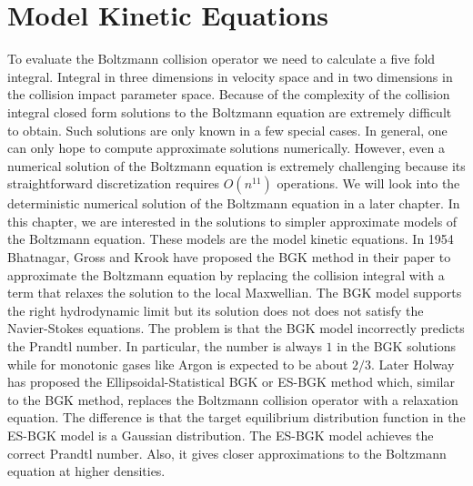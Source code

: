 \section{Model Kinetic Equations}
To evaluate the Boltzmann collision operator we need to calculate a five fold integral. Integral in three dimensions in velocity space and in two dimensions in the collision impact parameter space. Because of the complexity of the collision integral closed form solutions to the Boltzmann equation are extremely difficult to obtain. Such solutions are only known in a few special cases. In general, one can only hope to compute approximate solutions numerically. However, even a numerical solution of the Boltzmann equation is extremely challenging because its straightforward discretization requires $O(n^{11})$ operations. We will look into the deterministic numerical solution of the Boltzmann equation in a later chapter. In this chapter, we are interested in the solutions to simpler approximate models of the Boltzmann equation. These models are the model kinetic equations. In 1954 Bhatnagar, Gross and Krook have proposed the BGK method in their paper \cite{bgk} to approximate the Boltzmann equation by replacing the collision integral with a term that relaxes the solution to the local Maxwellian. The BGK model supports the right hydrodynamic limit but its solution does not does not satisfy the Navier-Stokes equations. The problem is that the BGK model incorrectly predicts the Prandtl number. In particular, the number is always $1$ in the BGK solutions while for monotonic gases like Argon is expected to be about $2/3$. Later Holway \cite{esbgk} has proposed the Ellipsoidal-Statistical BGK or ES-BGK method which, similar to the BGK method, replaces the Boltzmann collision operator with a relaxation equation. The difference is that the target equilibrium distribution function in the ES-BGK model is a Gaussian distribution. The ES-BGK model achieves the correct Prandtl number. Also, it gives closer approximations to the Boltzmann equation at higher densities.
